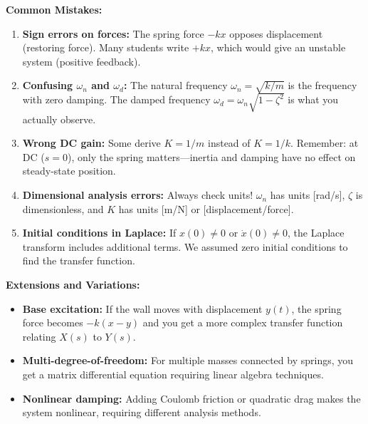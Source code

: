 \begin{example}
\textbf{Common Mistakes:}

\begin{enumerate}
    \item \textbf{Sign errors on forces:} The spring force $-kx$ opposes displacement (restoring force). Many students write $+kx$, which would give an unstable system (positive feedback).

    \item \textbf{Confusing $\omega_n$ and $\omega_d$:} The natural frequency $\omega_n = \sqrt{k/m}$ is the frequency with zero damping. The damped frequency $\omega_d = \omega_n\sqrt{1-\zeta^2}$ is what you actually observe.

    \item \textbf{Wrong DC gain:} Some derive $K = 1/m$ instead of $K = 1/k$. Remember: at DC ($s=0$), only the spring matters—inertia and damping have no effect on steady-state position.

    \item \textbf{Dimensional analysis errors:} Always check units! $\omega_n$ has units [rad/s], $\zeta$ is dimensionless, and $K$ has units [m/N] or [displacement/force].

    \item \textbf{Initial conditions in Laplace:} If $x(0) \neq 0$ or $\dot{x}(0) \neq 0$, the Laplace transform includes additional terms. We assumed zero initial conditions to find the transfer function.
\end{enumerate}

\textbf{Extensions and Variations:}

\begin{itemize}
    \item \textbf{Base excitation:} If the wall moves with displacement $y(t)$, the spring force becomes $-k(x-y)$ and you get a more complex transfer function relating $X(s)$ to $Y(s)$.

    \item \textbf{Multi-degree-of-freedom:} For multiple masses connected by springs, you get a matrix differential equation requiring linear algebra techniques.

    \item \textbf{Nonlinear damping:} Adding Coulomb friction or quadratic drag makes the system nonlinear, requiring different analysis methods.
\end{itemize}

\end{example}


